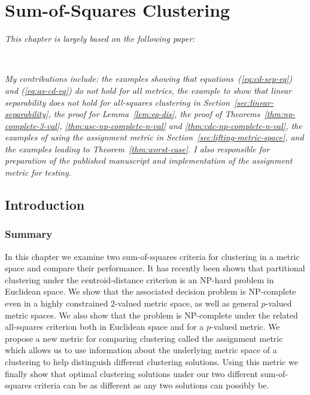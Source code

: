 \chapter{Sum-of-Squares Clustering}
\label{cha:sum-squar-clust}

\textit{This chapter is largely based on the following paper:}
\vspace{0.5em}

\noindent
{}\\



\vspace{1em}

\textit{My contributions include: the examples showing that
equations~(\ref{eq:cd-sep-eq}) and (\ref{eq:as-cd-eq}) do not hold for all
metrics, the example to show that linear separability does not hold for
all-squares clustering in Section~\ref{sec:linear-separability}, the proof for
Lemma~\ref{lem:eq-dis}, the proof of Theorems~\ref{thm:np-complete-3-val},
\ref{thm:asc-np-complete-n-val} and \ref{thm:cdc-np-complete-n-val}, the
examples of using the assignment metric in
Section~\ref{sec:lifting-metric-space}, and the examples leading to
Theorem~\ref{thm:worst-case}.  I also responsible for preparation of the
published manuscript and implementation of the assignment metric for testing.
}
\newpage

\section{Introduction}
\label{sec:ss-introduction}

\subsection{Summary}
\label{sec:summary-sum-squar}

In this chapter we examine two sum-of-squares criteria for clustering in a
metric space and compare their performance.  It has recently been shown that
partitional clustering under the centroid-distance criterion is an NP-hard
problem in Euclidean space.  We show that the associated decision problem
is NP-complete even in a highly constrained 2-valued metric space, as well as
general $p$-valued metric spaces.  We also show that the problem is
NP-complete under the related all-squares criterion both in Euclidean space
and for a $p$-valued metric.  We propose a new metric for comparing clustering
called the assignment metric which allows us to use information about the
underlying metric space of a clustering to help distinguish different
clustering solutions.  Using this metric we finally show that optimal
clustering solutions under our two different sum-of-squares criteria can be as
different as any two solutions can possibly be.

